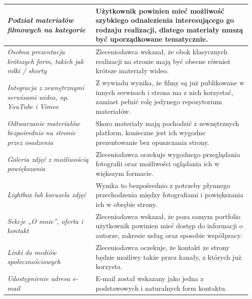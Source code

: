 \begin{longtable}{| p{} | p{} |}
\textit{Podział materiałów filmowych na kategorie                                      } & Użytkownik powinien mieć możliwość szybkiego odnalezienia interesującego go rodzaju realizacji, dlatego materiały muszą być uporządkowane tematycznie.          \\ \hline
\textit{Osobna prezentacja krótszych form, takich jak rolki / shorty                   } & Zleceniodawca wskazał, że obok klasycznych realizacji na stronie mają być obecne również krótsze materiały wideo.                                               \\ \hline
\textit{Integracja z zewnętrznymi serwisami wideo, np. YouTube i Vimeo                 } & Z wywiadu wynika, że filmy są już publikowane w innych serwisach i strona ma z nich korzystać, zamiast pełnić rolę jedynego repozytorium materiałów.            \\ \hline
\textit{Odtwarzanie materiałów bezpośrednio na stronie przez osadzenia                 } & Skoro materiały mają pochodzić z zewnętrznych platform, konieczne jest ich wygodne prezentowanie bez opuszczania strony.                                        \\ \hline
\textit{Galeria zdjęć z możliwością powiększania                                       } & Zleceniodawca oczekuje wygodnego przeglądania fotografii oraz możliwości oglądania ich w większym formacie.                                                     \\ \hline
\textit{Lightbox lub karuzela zdjęć                                                    } & Wynika to bezpośrednio z potrzeby płynnego przechodzenia między fotografiami i powiększania ich w obrębie strony.                                               \\ \hline
\textit{Sekcje „O mnie”, oferta i kontakt                                              } & Zleceniodawca wskazał, że poza samym portfolio użytkownik powinien mieć dostęp do informacji o autorze, zakresie usług oraz sposobie współpracy.                \\ \hline
\textit{Linki do mediów społecznościowych                                              } & Zleceniodawca oczekuje, że kontakt ze strony będzie możliwy także przez kanały, z których już korzysta.                                                         \\ \hline
\textit{Udostępnienie adresu e-mail                                                    } & E-mail został wskazany jako jedna z podstawowych i naturalnych form kontaktu.                                                                                   \\ \hline

\end{longtable}
